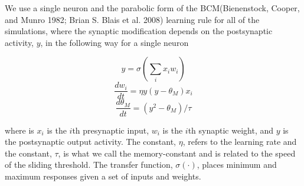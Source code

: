 \documentclass[
  letterpaper,
]{book}
\begin{document}
We use a single neuron and the parabolic form of the BCM(Bienenstock,
Cooper, and Munro 1982; Brian S. Blais et al. 2008) learning rule for
all of the simulations, where the synaptic modification depends on the
postsynaptic activity, \(y\), in the following way for a single neuron

\[
y=\sigma\left(\sum_i x_i w_i \right)
\] \[
\frac{dw_i}{dt} = \eta y(y-\theta_M) x_i
\] \[
\frac{d\theta_M}{dt} = (y^2-\theta_M)/\tau
\]

where is \(x_i\) is the \(i\)th presynaptic input, \(w_i\) is the
\(i\)th synaptic weight, and \(y\) is the postsynaptic output activity.
The constant, \(\eta\), refers to the learning rate and the constant,
\(\tau\), is what we call the memory-constant and is related to the
speed of the sliding threshold. The transfer function,
\(\sigma(\cdot)\), places minimum and maximum responses given a set of
inputs and weights.
\end{document}
